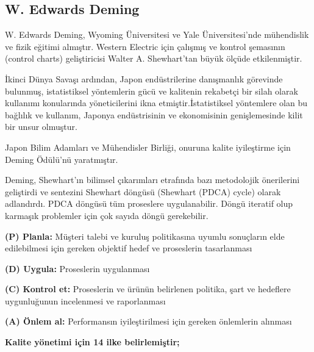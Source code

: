 \documentclass[
]{book}
\begin{document}
\hypertarget{w.-edwards-deming}{%
\subsection{W. Edwards Deming}\label{w.-edwards-deming}}

W. Edwards Deming, Wyoming Üniversitesi ve Yale Üniversitesi'nde mühendislik ve fizik eğitimi almıştır. Western Electric için çalışmış ve kontrol şemasının (control charts) geliştiricisi Walter A. Shewhart'tan büyük ölçüde etkilenmiştir.

İkinci Dünya Savaşı ardından, Japon endüstrilerine danışmanlık görevinde bulunmuş, istatistiksel yöntemlerin gücü ve kalitenin rekabetçi bir silah olarak kullanımı konularında yöneticilerini ikna etmiştir.İstatistiksel yöntemlere olan bu bağlılık ve kullanım, Japonya endüstrisinin ve ekonomisinin genişlemesinde kilit bir unsur olmuştur.

Japon Bilim Adamları ve Mühendisler Birliği, onuruna kalite iyileştirme için Deming Ödülü'nü yaratmıştır.

Deming, Shewhart'ın bilimsel çıkarımları etrafında bazı metodolojik önerilerini geliştirdi ve sentezini Shewhart döngüsü (Shewhart (PDCA) cycle) olarak adlandırdı. PDCA döngüsü tüm proseslere uygulanabilir. Döngü iteratif olup karmaşık problemler için çok sayıda döngü gerekebilir.

\textbf{(P) Planla:} Müşteri talebi ve kuruluş politikasına uyumlu sonuçların elde edilebilmesi için gereken objektif hedef ve proseslerin tasarlanması

\textbf{(D) Uygula:} Proseslerin uygulanması

\textbf{(C) Kontrol et:} Proseslerin ve ürünün belirlenen politika, şart ve hedeflere uygunluğunun incelenmesi ve raporlanması

\textbf{(A) Önlem al:} Performansın iyileştirilmesi için gereken önlemlerin alınması

\textbf{Kalite yönetimi için 14 ilke belirlemiştir;}
\end{document}
